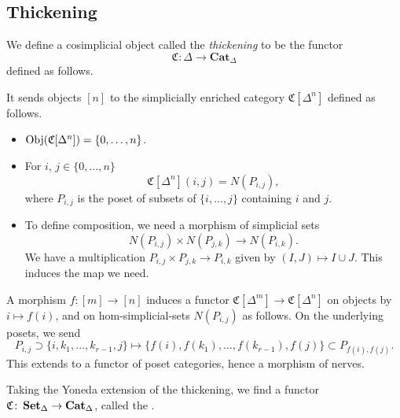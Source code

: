 \documentclass[main.tex]{subfiles}
\begin{document}
\subsection{Thickening}
\label{ssc:thickening}

\begin{definition}[thickening]
  \label{def:thickening}
  We define a cosimplicial object called the \emph{thickening} to be the functor
  \begin{equation*}
    \mathfrak{C}\colon \Delta \to \mathbf{Cat}_{\Delta}
  \end{equation*}
  defined as follows.

  It sends objects $[n]$ to the simplicially enriched category $\mathfrak{C}[\Delta^{n}]$ defined as follows.
  \begin{itemize}
    \item $\operatorname{Obj}(\mathfrak{C}[\Delta^{n}]) = \{0, \ldots, n\}$.

    \item For $i$, $j \in \{0, \ldots, n\}$
      \begin{equation*}
        \mathfrak{C}[\Delta^{n}](i, j) = N(P_{i, j}),
      \end{equation*}
      where $P_{i, j}$ is the poset of subsets of $\{i, \ldots, j\}$ containing $i$ and $j$.

    \item To define composition, we need a morphism of simplicial sets
      \begin{equation*}
        N(P_{i,j}) \times N(P_{j,k}) \to N(P_{i, k}).
      \end{equation*}
      We have a multiplication $P_{i,j} \times P_{j, k} \to P_{i, k}$ given by $(I, J) \mapsto I \cup J$. This induces the map we need.
  \end{itemize}

  A morphism $f\colon [m] \to [n]$ induces a functor $\mathfrak{C}[\Delta^{m}] \to \mathfrak{C}[\Delta^{n}]$ on objects by $i \mapsto f(i)$, and on hom-simplicial-sets $N(P_{i,j})$ as follows. On the underlying posets, we send
  \begin{equation*}
    P_{i,j} \supset \{ i, k_{1}, \ldots, k_{r-1}, j \} \mapsto \{f(i), f(k_{1}), \ldots, f(k_{r-1}), f(j)\} \subset P_{f(i),f(j)}.
  \end{equation*}
  This extends to a functor of poset categories, hence a morphism of nerves.

  Taking the Yoneda extension of the thickening, we find a functor $\mathfrak{C}\colon \operatorname{\mathbf{Set}_{\Delta}} \to \operatorname{\mathbf{Cat}_{\Delta}}$, called the .
\end{definition}
\end{document}

